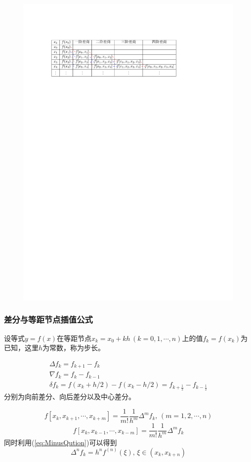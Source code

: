\begin{figure}[htbp]
    \centering
    \includegraphics{image/Newton插值表.pdf}
\end{figure}
\subsubsection{差分与等距节点插值公式}
设等式$y = f(x)$在等距节点$x_k = x_0+kh\,(k = 0,1,\cdots,n)$上的值$f_k = f(x_k)$为已知，这里$h$为常数，称为步长。
\begin{definition}[偏差]
    \[
        \begin{array}{c}
            \Delta f_k = f_{k+1}-f_k\\
            \nabla f_k = f_{k}-f_{k-1}\\
            \delta f_k=f(x_k+h/2)-f(x_k-h/2)=f_{k+\frac12}-f_{k-\frac12}
        \end{array}
    \]
    分别为向前差分、向后差分以及中心差分。
\end{definition}
\begin{corollary}
    \[
        f\left[ x_k,x_{k+1},\cdots,x_{k+m} \right] = \dfrac{1}{m!}\dfrac{1}{h^m}\Delta^mf_{k},\,(m = 1,2,\cdots,n)
    \]
    \[
        f\left[ x_k,x_{k-1},\cdots,x_{k-m} \right] = \dfrac{1}{m!}\dfrac{1}{h^m}\Delta^mf_{k}
    \]
    同时利用(\ref{eq:MinusQution})可以得到
    \[
        \Delta^nf_{k} = h^nf^{(n)}(\xi),\,\xi\in(x_k,x_{k+n})
    \]
\end{corollary}


